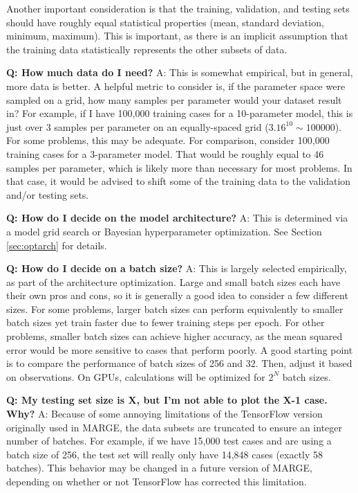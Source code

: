 \documentclass[letterpaper, 12pt]{article}
\begin{document}
\noindent Another important 
consideration is that the training, validation, and testing sets should have 
roughly equal statistical properties (mean, standard deviation, minimum, 
maximum).  This is important, as there is an implicit assumption that the 
training data statistically represents the other subsets of data.\newline

\noindent \textbf{Q: How much data do I need?} A: This is somewhat empirical, 
but in general, more data is better.  A helpful metric to consider is, if the 
parameter space were sampled on a grid, how many samples per parameter would 
your dataset result in?  For example, if I have 100,000 training cases for a 
10-parameter model, this is just over 3 samples per parameter on an 
equally-spaced grid ($3.16^{10} \sim 100000$).  For some problems, this may be 
adequate.  For comparison, consider 100,000 training cases for a 3-parameter 
model.  That would be roughly equal to 46 samples per parameter, which is 
likely more than necessary for most problems.  In that case, it would be 
advised to shift some of the training data to the validation and/or testing 
sets. \newline

\noindent \textbf{Q: How do I decide on the model architecture?} A: This is 
determined via a model grid search or Bayesian hyperparameter optimization.  
See Section \ref{sec:optarch} for details. \newline

\noindent \textbf{Q: How do I decide on a batch size?} A: This is largely 
selected empirically, as part of the architecture optimization.  
Large and small batch sizes each have their own pros 
and cons, so it is generally a good idea to consider a few different sizes.  
For some problems, larger batch 
sizes can perform equivalently to smaller batch sizes yet train faster due 
to fewer training steps per epoch.  For other problems, smaller batch sizes 
can achieve higher accuracy, as the mean squared error would be more sensitive 
to cases that perform poorly.  A good starting point is to compare the 
performance of batch sizes of 256 and 32.  Then, adjust it based on 
observations.  On GPUs, calculations will be optimized for $2^N$ batch 
sizes.\newline

\noindent \textbf{Q: My testing set size is X, but I'm not able to plot 
the X-1 case.  Why?}  A: Because of some annoying limitations of the TensorFlow 
version originally used in MARGE, the data subsets are truncated to ensure an 
integer number of batches.  For example, if we have 15,000 test cases and are 
using a batch size of 256, the test set will really only have 14,848 cases 
(exactly 58 batches).  This behavior may be changed in a future version of 
MARGE, depending on whether or not TensorFlow has corrected this limitation. \newline
\end{document}

